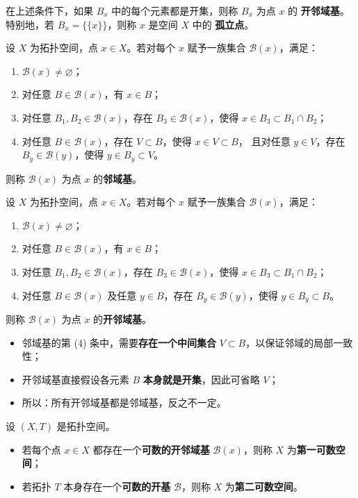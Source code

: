 \begin{definition}
在上述条件下，如果 $B_x$ 中的每个元素都是开集，则称 $B_x$ 为点 $x$ 的 \textbf{开邻域基}。  
特别地，若 $B_x = \{\{x\}\}$，则称 $x$ 是空间 $X$ 中的 \textbf{孤立点}。
\end{definition}
\begin{proposition}[邻域基的性质]
设 $X$ 为拓扑空间，点 $x \in X$。若对每个 $x$ 赋予一族集合 $\mathcal{B}(x)$，满足：
\begin{enumerate}
  \item $\mathcal{B}(x)\neq\varnothing$；
  \item 对任意 $B\in\mathcal{B}(x)$，有 $x\in B$；
  \item 对任意 $B_1,B_2\in\mathcal{B}(x)$，存在 $B_3\in\mathcal{B}(x)$，使得 $x\in B_3\subset B_1\cap B_2$；
  \item 对任意 $B\in\mathcal{B}(x)$，存在 $V\subset B$，使得 $x\in V\subset B$，
  且对任意 $y\in V$，存在 $B_y\in\mathcal{B}(y)$，使得 $y\in B_y\subset V$。
\end{enumerate}
则称 $\mathcal{B}(x)$ 为点 $x$ 的\textbf{邻域基}。
\end{proposition}

\begin{proposition}[开邻域基的性质]
设 $X$ 为拓扑空间，点 $x\in X$。若对每个 $x$ 赋予一族集合 $\mathcal{B}(x)$，满足：
\begin{enumerate}
  \item $\mathcal{B}(x)\neq\varnothing$；
  \item 对任意 $B\in\mathcal{B}(x)$，有 $x\in B$；
  \item 对任意 $B_1,B_2\in\mathcal{B}(x)$，存在 $B_3\in\mathcal{B}(x)$，使得 $x\in B_3\subset B_1\cap B_2$；
  \item 对任意 $B\in\mathcal{B}(x)$ 及任意 $y\in B$，存在 $B_y\in\mathcal{B}(y)$，使得 $y\in B_y\subset B$。
\end{enumerate}
则称 $\mathcal{B}(x)$ 为点 $x$ 的\textbf{开邻域基}。
\end{proposition}

\begin{dxtips}[区别总结]
\begin{itemize}
  \item 邻域基的第 (4) 条中，需要\textbf{存在一个中间集合} $V\subset B$，以保证邻域的局部一致性；
  \item 开邻域基直接假设各元素 $B$ \textbf{本身就是开集}，因此可省略 $V$；
  \item 所以：所有开邻域基都是邻域基，反之不一定。
\end{itemize}
\end{dxtips}
\begin{definition}[第一可数空间与第二可数空间]
设 $(X,T)$ 是拓扑空间。
\begin{itemize}
  \item 若每个点 $x\in X$ 都存在一个\textbf{可数的开邻域基} $\mathcal{B}(x)$，则称 $X$ 为\textbf{第一可数空间}；
  \item 若拓扑 $T$ 本身存在一个\textbf{可数的开基} $\mathcal{B}$，则称 $X$ 为\textbf{第二可数空间}。
\end{itemize}
\end{definition}

